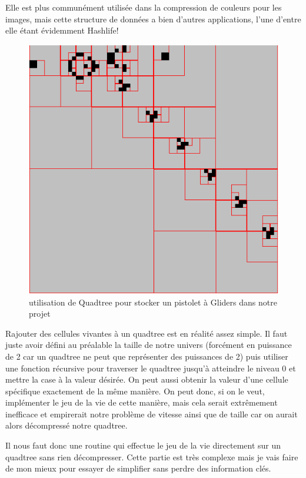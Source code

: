 Elle est plus communément utilisée dans la compression de couleurs pour les images, mais cette structure de données a bien d'autres applications, l'une d'entre elle étant évidemment Hashlife!

\begin{figure}[htp]
        \center
        \includegraphics[scale=0.2]{images/imgHashlife/quadLife1.png}
        \caption{utilisation de Quadtree pour stocker un pistolet à Gliders dans notre projet}
\end{figure}

Rajouter des cellules vivantes à un quadtree est en réalité assez simple.
Il faut juste avoir défini au préalable la taille de notre univers (forcément en puissance de 2 car un quadtree ne peut que représenter des puissances de 2) puis utiliser une fonction récursive pour traverser le quadtree jusqu'à atteindre le niveau 0 et mettre la case à la valeur désirée. On peut aussi obtenir la valeur d'une cellule spécifique exactement de la même manière. On peut donc, si on le veut, implémenter le jeu de la vie de cette manière, mais cela serait extrêmement inefficace et empirerait notre problème de vitesse ainsi que de taille car on aurait alors décompressé notre quadtree.

Il nous faut donc une routine qui effectue le jeu de la vie directement sur un quadtree sans rien décompresser. Cette partie est très complexe mais je vais faire de mon mieux pour essayer de simplifier sans perdre des information clés.

